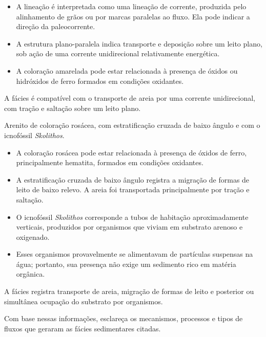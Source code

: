 \begin{description}[style=nextline,leftmargin=1.5cm,labelsep=0.5em]
\begin{itemize}
    \item A lineação é interpretada como uma lineação de corrente, produzida
    pelo alinhamento de grãos ou por marcas paralelas ao fluxo. Ela pode indicar
    a direção da paleocorrente.

    \item A estrutura plano-paralela indica transporte e deposição sobre um
    leito plano, sob ação de uma corrente unidirecional relativamente energética.

    \item A coloração amarelada pode estar relacionada à presença de óxidos ou
    hidróxidos de ferro formados em condições oxidantes.
\end{itemize}

A fácies é compatível com o transporte de areia por uma corrente unidirecional,
com tração e saltação sobre um leito plano.


\item[\textbf{Fácies E}] Arenito de coloração rosácea, com estratificação
cruzada de baixo ângulo e com o icnofóssil \textit{Skolithos}.

\begin{itemize}
    \item A coloração rosácea pode estar relacionada à presença de óxidos de
    ferro, principalmente hematita, formados em condições oxidantes.

    \item A estratificação cruzada de baixo ângulo registra a migração de formas
    de leito de baixo relevo. A areia foi transportada principalmente por tração
    e saltação.

    \item O icnofóssil \textit{Skolithos} corresponde a tubos de habitação
    aproximadamente verticais, produzidos por organismos que viviam em
    substrato arenoso e oxigenado.

    \item Esses organismos provavelmente se alimentavam de partículas
    suspensas na água; portanto, sua presença não exige um sedimento rico em
    matéria orgânica.
\end{itemize}

A fácies registra transporte de areia, migração de formas de leito e posterior
ou simultânea ocupação do substrato por organismos.

\end{description}

Com base nessas informações, esclareça os mecanismos, processos e tipos de
fluxos que geraram as fácies sedimentares citadas.

